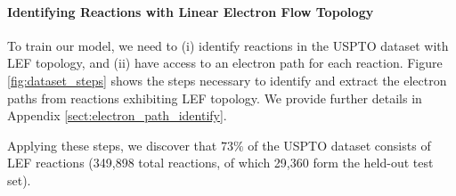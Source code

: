 \paragraph{Identifying Reactions with Linear Electron Flow Topology}
To train our model, we need to (i) identify reactions in the USPTO dataset with LEF topology, and (ii) have access to an electron path for each reaction. 
Figure \ref{fig:dataset_steps} shows the steps necessary to identify and extract the electron paths from reactions exhibiting LEF topology. We provide further details in Appendix \ref{sect:electron_path_identify}.




Applying these steps, we discover that $73\%$ of the USPTO dataset consists of LEF reactions (349,898 total reactions, of which 29,360 form the held-out test set).







